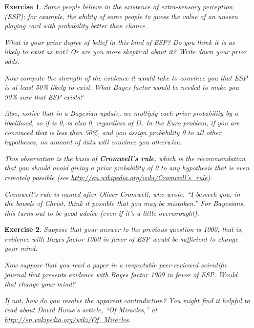 \documentclass[12pt]{book}
\theoremstyle{exercise}
\newtheorem{exercise}{Exercise}[chapter]
\begin{document}
\begin{exercise}
Some people believe in the existence of extra-sensory
perception (ESP); for example, the ability of some people to guess
the value of an unseen playing card with probability better
than chance.

What is your prior degree of belief in this kind of ESP?
Do you think it is as likely to exist as not?  Or are you
more skeptical about it?  Write down your prior odds.

Now compute the strength of the evidence it would take to
convince you that ESP is at least 50\% likely to exist.
What Bayes factor would be needed to make you 90\% sure
that ESP exists?

Also, notice that in a Bayesian update, we multiply
each prior probability by a likelihood, so if  is 0,
 is also 0, regardless of $D$.  In the Euro problem,
if you are convinced that  is less than 50\%, and you assign
probability 0 to all other hypotheses, no amount of data will
convince you otherwise.

This observation is the basis of {\bf Cromwell's rule}, which is the
recommendation that you should avoid giving a prior probability of
0 to any hypothesis that is even remotely possible
(see \url{http://en.wikipedia.org/wiki/Cromwell's_rule}).

Cromwell's rule is named after Oliver Cromwell, who wrote, ``I beseech
you, in the bowels of Christ, think it possible that you may be
mistaken.''  For Bayesians, this turns out to be good advice (even if
it's a little overwrought).
\end{exercise}


\begin{exercise}
Suppose that your answer to the previous question is 1000;
that is, evidence with Bayes factor 1000 in favor of ESP would
be sufficient to change your mind.

Now suppose that you read a paper in a respectable peer-reviewed
scientific journal that presents evidence with Bayes factor 1000 in
favor of ESP.  Would that change your mind?

If not, how do you resolve the apparent contradiction?
You might find it helpful to read about David Hume's article, ``Of
Miracles,'' at \url{http://en.wikipedia.org/wiki/Of_Miracles}.

\end{exercise}
\end{document}
